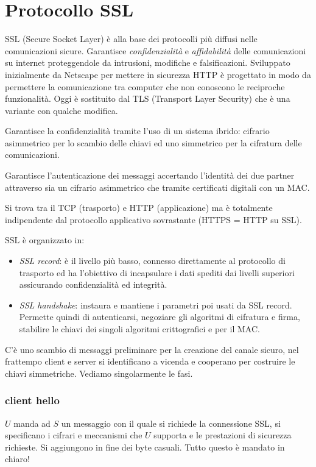 \section{Protocollo SSL}
SSL (Secure Socket Layer) è alla base dei protocolli più diffusi nelle comunicazioni sicure.
Garantisce \emph{confidenzialità} e \emph{affidabilità} delle comunicazioni su internet proteggendole da intrusioni, modifiche e falsificazioni.
Sviluppato inizialmente da Netscape per mettere in sicurezza HTTP è progettato in modo da permettere la comunicazione tra computer che non conoscono le reciproche funzionalità.
Oggi è sostituito dal TLS (Transport Layer Security) che è una variante con qualche modifica.

Garantisce la confidenzialità tramite l'uso di un sistema ibrido: cifrario asimmetrico per lo scambio delle chiavi ed uno simmetrico per la cifratura delle comunicazioni.

Garantisce l'autenticazione dei messaggi accertando l'identità dei due partner attraverso sia un cifrario asimmetrico che tramite certificati digitali con un MAC.

Si trova tra il TCP (trasporto) e HTTP (applicazione) ma è totalmente indipendente dal protocollo applicativo sovrastante (HTTPS = HTTP su SSL).

SSL è organizzato in:
\begin{itemize}
    \item \emph{SSL record}: è il livello più basso, connesso direttamente al protocollo di trasporto ed ha l'obiettivo di incapsulare i dati spediti dai livelli superiori assicurando confidenzialità ed integrità.
    \item \emph{SSL handshake}: instaura e mantiene i parametri poi usati da SSL record. Permette quindi di autenticarsi, negoziare gli algoritmi di cifratura e firma, stabilire le chiavi dei singoli algoritmi crittografici e per il MAC.
\end{itemize}

C'è uno scambio di messaggi preliminare per la creazione del canale sicuro, nel frattempo client e server si identificano a vicenda e cooperano per costruire le chiavi simmetriche. Vediamo singolarmente le fasi.

\subsubsection{client hello}
$U$ manda ad $S$ un messaggio con il quale si richiede la connessione SSL, si specificano i cifrari e meccanismi che $U$ supporta e le prestazioni di sicurezza richieste.
Si aggiungono in fine dei byte casuali. Tutto questo è mandato in chiaro!

